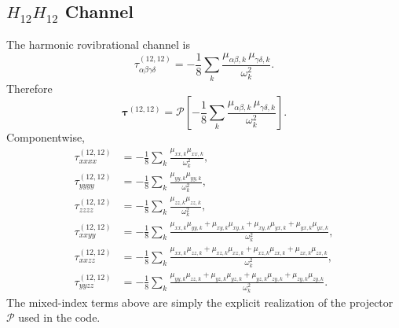 \documentclass[aip,jcp,reprint]{revtex4-2}
\begin{document}
\begin{widetext}
\subsection{$H_{12}H_{12}$ Channel}
The harmonic rovibrational channel is
\begin{equation}
\tau^{(12,12)}_{\alpha\beta\gamma\delta}
=
-\frac{1}{8}\sum_k
\frac{\mu_{\alpha\beta,k}\,\mu_{\gamma\delta,k}}{\omega_k^2}.
\end{equation}
Therefore
\begin{equation}
\bm{\tau}^{(12,12)} = \mathcal{P}\!\left[
-\frac{1}{8}\sum_k \frac{\mu_{\alpha\beta,k}\,\mu_{\gamma\delta,k}}{\omega_k^2}
\right].
\end{equation}
Componentwise,
\begin{align}
\tau^{(12,12)}_{xxxx} &= -\frac{1}{8}\sum_k \frac{\mu_{xx,k}\mu_{xx,k}}{\omega_k^2}, \\
\tau^{(12,12)}_{yyyy} &= -\frac{1}{8}\sum_k \frac{\mu_{yy,k}\mu_{yy,k}}{\omega_k^2}, \\
\tau^{(12,12)}_{zzzz} &= -\frac{1}{8}\sum_k \frac{\mu_{zz,k}\mu_{zz,k}}{\omega_k^2}, \\
\tau^{(12,12)}_{xxyy} &= -\frac{1}{8}\sum_k \frac{\mu_{xx,k}\mu_{yy,k}+\mu_{xy,k}\mu_{xy,k}+\mu_{xy,k}\mu_{yx,k}+\mu_{yx,k}\mu_{yx,k}}{\omega_k^2}, \\
\tau^{(12,12)}_{xxzz} &= -\frac{1}{8}\sum_k \frac{\mu_{xx,k}\mu_{zz,k}+\mu_{xz,k}\mu_{xz,k}+\mu_{xz,k}\mu_{zx,k}+\mu_{zx,k}\mu_{zx,k}}{\omega_k^2}, \\
\tau^{(12,12)}_{yyzz} &= -\frac{1}{8}\sum_k \frac{\mu_{yy,k}\mu_{zz,k}+\mu_{yz,k}\mu_{yz,k}+\mu_{yz,k}\mu_{zy,k}+\mu_{zy,k}\mu_{zy,k}}{\omega_k^2}.
\end{align}
The mixed-index terms above are simply the explicit realization of the projector
$\mathcal{P}$ used in the code.


\end{widetext}
\end{document}

